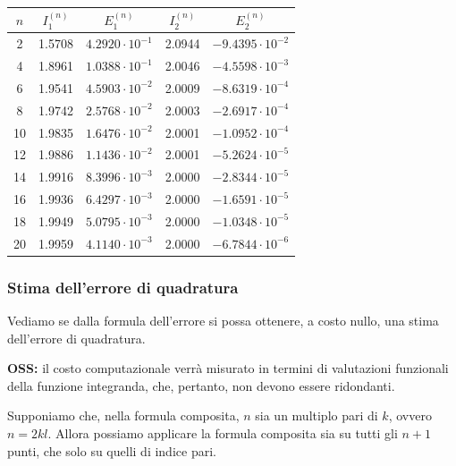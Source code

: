 \begin{table}[htbp]
\centering
\renewcommand{\arraystretch}{1.2}
\begin{tabular}{ccccc}
\toprule
$n$ & $I_1^{(n)}$ & $E_1^{(n)}$ & $I_2^{(n)}$ & $E_2^{(n)}$ \\
\midrule
2  & 1.5708 & $4.2920 \cdot 10^{-1}$ & 2.0944 & $-9.4395 \cdot 10^{-2}$ \\
4  & 1.8961 & $1.0388 \cdot 10^{-1}$ & 2.0046 & $-4.5598 \cdot 10^{-3}$ \\
6  & 1.9541 & $4.5903 \cdot 10^{-2}$ & 2.0009 & $-8.6319 \cdot 10^{-4}$ \\
8  & 1.9742 & $2.5768 \cdot 10^{-2}$ & 2.0003 & $-2.6917 \cdot 10^{-4}$ \\
10 & 1.9835 & $1.6476 \cdot 10^{-2}$ & 2.0001 & $-1.0952 \cdot 10^{-4}$ \\
12 & 1.9886 & $1.1436 \cdot 10^{-2}$ & 2.0001 & $-5.2624 \cdot 10^{-5}$ \\
14 & 1.9916 & $8.3996 \cdot 10^{-3}$ & 2.0000 & $-2.8344 \cdot 10^{-5}$ \\
16 & 1.9936 & $6.4297 \cdot 10^{-3}$ & 2.0000 & $-1.6591 \cdot 10^{-5}$ \\
18 & 1.9949 & $5.0795 \cdot 10^{-3}$ & 2.0000 & $-1.0348 \cdot 10^{-5}$ \\
20 & 1.9959 & $4.1140 \cdot 10^{-3}$ & 2.0000 & $-6.7844 \cdot 10^{-6}$ \\
\bottomrule
\end{tabular}
\end{table}













\vspace{0.6cm}
\subsubsection*{Stima dell'errore di quadratura}

Vediamo se dalla formula dell'errore si possa ottenere, a costo nullo, una stima dell'errore di quadratura.

\textbf{OSS:} il costo computazionale verrà misurato in termini di valutazioni funzionali della funzione integranda, che, pertanto, non devono essere ridondanti.

Supponiamo che, nella formula composita, $n$ sia un multiplo pari di $k$, ovvero $n = 2kl$. Allora possiamo applicare la formula composita sia su tutti gli $n+1$ punti, che solo su quelli di indice pari.

